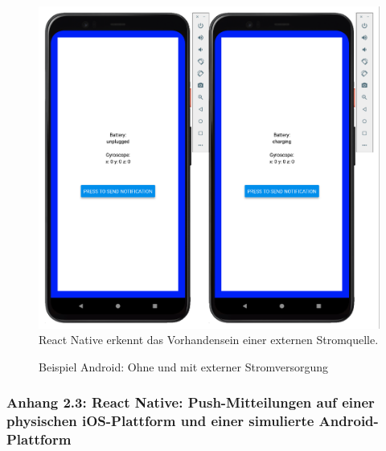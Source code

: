 \documentclass[a4paper]{scrartcl}
\begin{document}
\begin{figure}[H]
	\centering
	\caption{Beispiel Android: Ohne und mit externer Stromversorgung}
	\includegraphics[scale=0.3]{_assets/Android_unplugged_charging.png} \\
	\justifying
	\small	
	React Native erkennt das Vorhandensein einer externen Stromquelle. 
\end{figure}

\newpage

\subsubsection*{Anhang 2.3: React Native: Push-Mitteilungen auf einer physischen iOS-Plattform und einer simulierte Android-Plattform }
\end{document}
